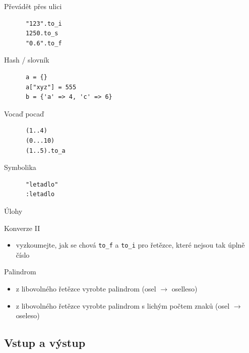 \documentclass{beamer}
\begin{document}
\begin{frame}[fragile]{}
  \begin{block}{Převádět přes ulici}
    \begin{verbatim}
      "123".to_i
      1250.to_s
      "0.6".to_f
    \end{verbatim}
  \end{block}
  \pause
  \begin{block}{Hash / slovník}
    \begin{verbatim}
      a = {}
      a["xyz"] = 555
      b = {'a' => 4, 'c' => 6}
    \end{verbatim}
  \end{block}
\end{frame}

\begin{frame}[fragile]{}
  \begin{block}{Vocaď pocaď}
    \begin{verbatim}
      (1..4)
      (0...10)
      (1..5).to_a
    \end{verbatim}
  \end{block}
  \pause
  \begin{block}{Symbolika}
    \begin{verbatim}
      "letadlo"
      :letadlo
    \end{verbatim}
  \end{block}
\end{frame}

\begin{frame}[fragile]{Úlohy}
  \begin{block}{Konverze II}
    \begin{itemize}
      \item vyzkoumejte, jak se chová \texttt{to\_f} a \texttt{to\_i} pro řetězce, které nejsou tak úplně číslo
    \end{itemize}
  \end{block}
  \pause
  \begin{block}{Palindrom}
    \begin{itemize}
      \item z libovolného řetězce vyrobte palindrom (osel $\to$ oselleso)
      \item z libovolného řetězce vyrobte palindrom s lichým počtem znaků (osel $\to$ oseleso)
    \end{itemize}
  \end{block}
\end{frame}

\subsection{Vstup a výstup}
\end{document}
